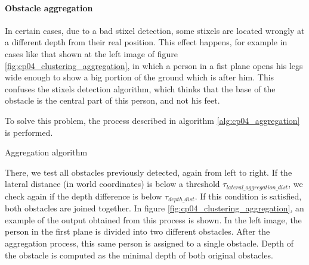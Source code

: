 \paragraph{Obstacle aggregation}\label{ch:chapter04_01_04_01_01}

In certain cases, due to a bad stixel detection, some stixels are located wrongly at a different depth from their real position. This effect happens, for example in cases like that shown at the left image of figure \ref{fig:cp04_clustering_aggregation}, in which a person in a fist plane opens his legs wide enough to show a big portion of the ground which is after him. This confuses the stixels detection algorithm, which thinks that the base of the obstacle is the central part of this person, and not his feet.

To solve this problem, the process described in algorithm \ref{alg:cp04_aggregation} is performed.

\begin{algorithm}
\caption{Aggregation algorithm}
\label{alg:cp04_aggregation}
\begin{algorithmic}

    \EndIf
  \EndFor
\EndFunction
\end{algorithmic}
\end{algorithm}

There, we test all obstacles previously detected, again from left to right. If the lateral distance (in world coordinates) is below a threshold $\tau_{lateral\_aggregation\_dist}$, we check again if the depth difference is below $\tau_{depth\_dist}$. If this condition is satisfied, both obstacles are joined together. In figure \ref{fig:cp04_clustering_aggregation}, an example of the output obtained from this process is shown. In the left image, the person in the first plane is divided into two different obstacles. After the aggregation process, this same person is assigned to a single obstacle. Depth of the obstacle is computed as the minimal depth of both original obstacles.

